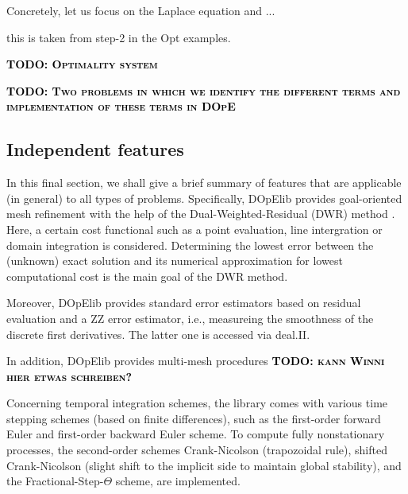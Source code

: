 \documentclass[prodmode,acmtoms]{acmsmall}
\numberwithin{equation}{section}
\newcommand{\todo}[1]{\textbf{\textsc{\textcolor{black}{TODO: #1}}}}
\begin{document}
Concretely, let us focus on the Laplace equation and ...

this is taken from step-2 in the Opt examples.

\todo{Optimality system}

\todo{Two problems in which we identify the different terms and implementation 
of these terms in DOpE}




\subsection{Independent features}
In this final section, we shall give a brief summary of features 
that are applicable (in general) to all types of problems. Specifically,
DOpElib provides goal-oriented mesh refinement with the help of the 
Dual-Weighted-Residual (DWR) method \cite{BeRa96}. Here, a certain 
cost functional such as a point evaluation, line intergration or domain
integration is considered. Determining the lowest error between the 
(unknown) exact solution and its numerical approximation for lowest computational
cost is the main goal of the DWR method.

Moreover, DOpElib provides standard error estimators based on residual evaluation and 
a ZZ error estimator, i.e., measureing the smoothness of the discrete first derivatives.
The latter one is accessed via deal.II. 

In addition, DOpElib provides multi-mesh procedures 
\todo{kann Winni hier etwas schreiben?}

Concerning temporal integration schemes, the library comes 
with various time stepping schemes (based on finite differences), 
such as the first-order forward Euler and first-order backward Euler scheme. 
To compute fully nonstationary processes, the second-order schemes
Crank-Nicolson (trapozoidal rule), 
shifted Crank-Nicolson (slight shift to the implicit side to maintain
global stability), 
and the Fractional-Step-$\Theta$ scheme, are implemented.
\end{document}
